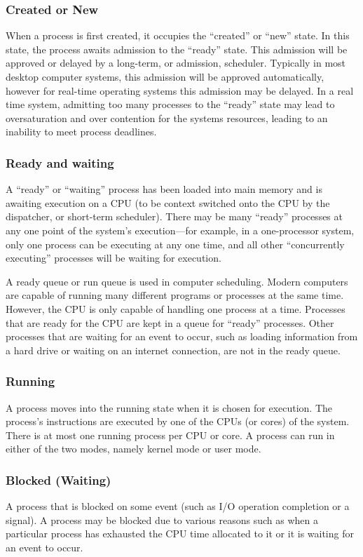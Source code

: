 \documentclass[a4paper, twoside]{article}
\begin{document}
\subsubsection{Created or New}
When a process is first created, it occupies the ``created'' or ``new'' state. In this state, the process awaits admission to the ``ready'' state. This admission will be approved or delayed by a long-term, or admission, scheduler. Typically in most desktop computer systems, this admission will be approved automatically, however for real-time operating systems this admission may be delayed. In a real time system, admitting too many processes to the ``ready'' state may lead to oversaturation and over contention for the systems resources, leading to an inability to meet process deadlines.

\subsubsection{Ready and waiting}
A ``ready'' or ``waiting'' process has been loaded into main memory and is awaiting execution on a CPU (to be context switched onto the CPU by the dispatcher, or short-term scheduler). There may be many ``ready'' processes at any one point of the system's execution—for example, in a one-processor system, only one process can be executing at any one time, and all other ``concurrently executing'' processes will be waiting for execution.

A ready queue or run queue is used in computer scheduling. Modern computers are capable of running many different programs or processes at the same time. However, the CPU is only capable of handling one process at a time. Processes that are ready for the CPU are kept in a queue for ``ready'' processes. Other processes that are waiting for an event to occur, such as loading information from a hard drive or waiting on an internet connection, are not in the ready queue.

\subsubsection{Running}
A process moves into the running state when it is chosen for execution. The process's instructions are executed by one of the CPUs (or cores) of the system. There is at most one running process per CPU or core. A process can run in either of the two modes, namely kernel mode or user mode.

\subsubsection{Blocked (Waiting)}
A process that is blocked on some event (such as I/O operation completion or a signal). A process may be blocked due to various reasons such as when a particular process has exhausted the CPU time allocated to it or it is waiting for an event to occur.
\end{document}
